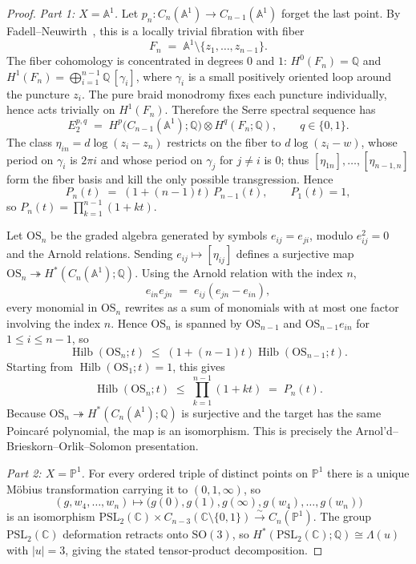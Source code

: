 \begin{proof}
\emph{Part 1: $X=\mathbb{A}^1$.}
Let
$p_n\colon C_n(\mathbb{A}^1)\to C_{n-1}(\mathbb{A}^1)$
forget the last point. By Fadell--Neuwirth~\cite{FadellNeuwirth62},
this is a locally trivial fibration with fiber
\[
F_n
\;=\;
\mathbb{A}^1\setminus\{z_1,\ldots,z_{n-1}\}.
\]
The fiber cohomology is concentrated in degrees $0$ and $1$:
$H^0(F_n)=\mathbb{Q}$ and
$H^1(F_n)=\bigoplus_{i=1}^{n-1}\mathbb{Q}\,[\gamma_i]$, where
$\gamma_i$ is a small positively oriented loop around the puncture
$z_i$. The pure braid monodromy fixes each puncture individually, hence
acts trivially on $H^1(F_n)$. Therefore the Serre spectral sequence has
\[
E_2^{p,q}
\;=\;
H^p\!\bigl(C_{n-1}(\mathbb{A}^1);\mathbb{Q}\bigr)
\otimes
H^q(F_n;\mathbb{Q}),
\qquad q\in\{0,1\}.
\]
The class $\eta_{in}=d\log(z_i-z_n)$ restricts on the fiber to
$d\log(z_i-w)$, whose period on $\gamma_i$ is $2\pi i$ and whose period
on $\gamma_j$ for $j\neq i$ is $0$; thus
$[\eta_{1n}],\ldots,[\eta_{n-1,n}]$ form the fiber basis and kill the
only possible transgression. Hence
\[
P_n(t)
\;=\;
(1+(n-1)t)\,P_{n-1}(t),
\qquad
P_1(t)=1,
\]
so
$P_n(t)=\prod_{k=1}^{n-1}(1+kt)$.

Let $\mathrm{OS}_n$ be the graded algebra generated by symbols
$e_{ij}=e_{ji}$, modulo $e_{ij}^2=0$ and the Arnold relations.
Sending $e_{ij}\mapsto[\eta_{ij}]$ defines a surjective map
$\mathrm{OS}_n\twoheadrightarrow H^*(C_n(\mathbb{A}^1);\mathbb{Q})$.
Using the Arnold relation with the index $n$,
\[
e_{in}e_{jn}
\;=\;
e_{ij}(e_{jn}-e_{in}),
\]
every monomial in $\mathrm{OS}_n$ rewrites as a sum of monomials with at
most one factor involving the index $n$. Hence
$\mathrm{OS}_n$ is spanned by
$\mathrm{OS}_{n-1}$ and
$\mathrm{OS}_{n-1}e_{in}$ for $1\leq i\leq n-1$, so
\[
\operatorname{Hilb}(\mathrm{OS}_n;t)
\;\leq\;
(1+(n-1)t)\operatorname{Hilb}(\mathrm{OS}_{n-1};t).
\]
Starting from $\operatorname{Hilb}(\mathrm{OS}_1;t)=1$, this gives
\[
\operatorname{Hilb}(\mathrm{OS}_n;t)
\;\leq\;
\prod_{k=1}^{n-1}(1+kt)
\;=\;
P_n(t).
\]
Because $\mathrm{OS}_n\twoheadrightarrow H^*(C_n(\mathbb{A}^1);\mathbb{Q})$
is surjective and the target has the same Poincar\'e polynomial, the
map is an isomorphism. This is precisely the
Arnol'd--Brieskorn--Orlik--Solomon presentation.

\emph{Part 2: $X=\mathbb{P}^1$.}
For every ordered triple of distinct points on $\mathbb{P}^1$ there is a
unique M\"obius transformation carrying it to $(0,1,\infty)$, so
\[
(g,w_4,\ldots,w_n)
\longmapsto
\bigl(g(0),g(1),g(\infty),g(w_4),\ldots,g(w_n)\bigr)
\]
is an isomorphism
$\mathrm{PSL}_2(\mathbb{C})\times
C_{n-3}(\mathbb{C}\setminus\{0,1\})
\xrightarrow{\sim}
C_n(\mathbb{P}^1)$.
The group $\mathrm{PSL}_2(\mathbb{C})$ deformation retracts onto
$\mathrm{SO}(3)$, so
$H^*(\mathrm{PSL}_2(\mathbb{C});\mathbb{Q})\cong\Lambda(u)$ with
$|u|=3$, giving the stated tensor-product decomposition.


\end{proof}
